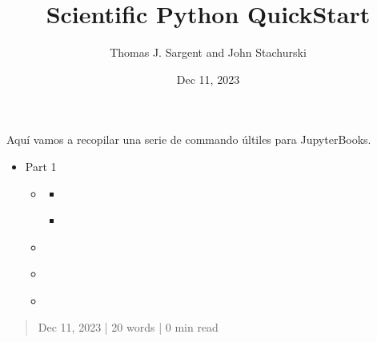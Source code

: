 \documentclass[letterpaper,10pt,english]{jupyterBook}
\title{Scientific Python QuickStart}
\date{Dec 11, 2023}
\author{Thomas J.\@{} Sargent and John Stachurski}
\begin{document}
\pagestyle{empty}
\sphinxmaketitle
\pagestyle{plain}
\sphinxtableofcontents
\pagestyle{normal}
\label{\detokenize{docs/index::doc}}


\sphinxAtStartPar
Aquí vamos a recopilar una serie de commando últiles para JupyterBooks.

\sphinxAtStartPar
{}

\sphinxAtStartPar
{}

\sphinxAtStartPar
{}
\begin{itemize}
\item {} 
\sphinxAtStartPar
Part 1

\begin{itemize}
\item {} 
\sphinxAtStartPar
{\hyperref[\detokenize{docs/01_00_Code_Blocks_y_ecuaciones::doc}]{}}
\begin{itemize}
\item {} 
\sphinxAtStartPar
{\hyperref[\detokenize{docs/01_01_Code_Blocks::doc}]{}}

\item {} 
\sphinxAtStartPar
{\hyperref[\detokenize{docs/01_02_Ecuaciones::doc}]{}}

\end{itemize}

\item {} 
\sphinxAtStartPar
{\hyperref[\detokenize{docs/02_00_Roles_and_directives::doc}]{}}

\item {} 
\sphinxAtStartPar
{\hyperref[\detokenize{docs/03_00_referenciar_cosas::doc}]{}}

\item {} 
\sphinxAtStartPar
{\hyperref[\detokenize{docs/04_00_Teoremas_pruebas_y_algoritmos::doc}]{}}

\end{itemize}
\end{itemize}

\sphinxstepscope
\begin{quote}

\sphinxAtStartPar
Dec 11, 2023 | 20 words | 0 min read
\end{quote}
\end{document}
